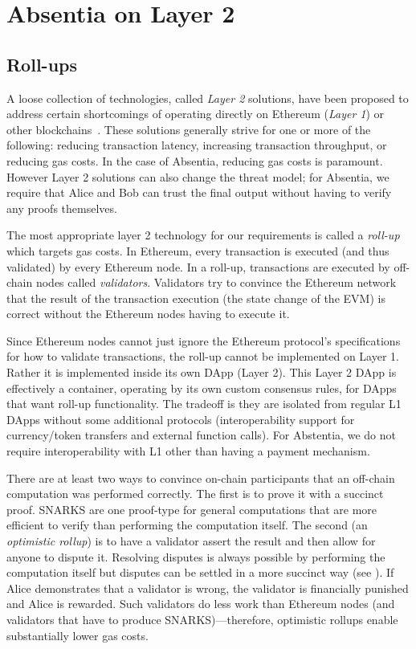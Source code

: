 
\section{Absentia on Layer 2 }
\label{sec:arb}

\subsection{Roll-ups}

A loose collection of technologies, called \emph{Layer 2} solutions, have been proposed to address certain shortcomings of operating directly on Ethereum (\emph{Layer 1}) or other blockchains~\cite{GMR+20}. These solutions generally strive for one or more of the following: reducing transaction latency, increasing transaction throughput, or reducing gas costs. In the case of Absentia, reducing gas costs is paramount. However Layer 2 solutions can also change the threat model; for Absentia, we require that Alice and Bob can trust the final output without having to verify any proofs themselves. 

The most appropriate layer 2 technology for our requirements is called a \emph{roll-up} which targets gas costs. In Ethereum, every transaction is executed (and thus validated) by every Ethereum node. In a roll-up, transactions are executed by off-chain nodes called \emph{validators}. Validators try to convince the Ethereum network that the result of the transaction execution (\ie the state change of the EVM) is correct without the Ethereum nodes having to execute it. 

Since Ethereum nodes cannot just ignore the Ethereum protocol's specifications for how to validate transactions, the roll-up cannot be implemented on Layer 1. Rather it is implemented inside its own DApp (Layer 2). This Layer 2 DApp is effectively a container, operating by its own custom consensus rules, for DApps that want roll-up functionality. The tradeoff is they are isolated from regular L1 DApps without some additional protocols (\eg interoperability support for currency/token transfers and external function calls). For Abstentia, we do not require interoperability with L1 other than having a payment mechanism.

There are at least two ways to convince on-chain participants that an off-chain computation was performed correctly. The first is to prove it with a succinct proof. SNARKS are one proof-type for general computations that are more efficient to verify than performing the computation itself. The second (an \emph{optimistic rollup}) is to have a validator assert the result and then allow for anyone to dispute it. Resolving disputes is always possible by performing the computation itself but disputes can be settled in a more succinct way (see \cite{KGCWF18}). If Alice demonstrates that a validator is wrong, the validator is financially punished and Alice is rewarded. Such validators do less work than Ethereum nodes (and validators that have to produce SNARKS)---therefore, optimistic rollups enable substantially lower gas costs.

